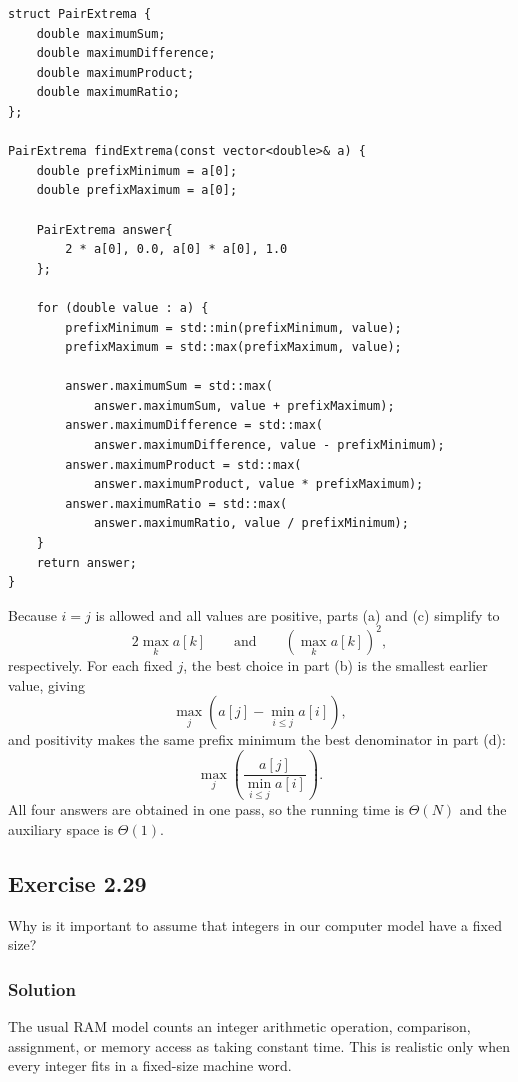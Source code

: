 \documentclass[12pt,a4paper]{article}
\begin{document}
\begin{lstlisting}
struct PairExtrema {
    double maximumSum;
    double maximumDifference;
    double maximumProduct;
    double maximumRatio;
};

PairExtrema findExtrema(const vector<double>& a) {
    double prefixMinimum = a[0];
    double prefixMaximum = a[0];

    PairExtrema answer{
        2 * a[0], 0.0, a[0] * a[0], 1.0
    };

    for (double value : a) {
        prefixMinimum = std::min(prefixMinimum, value);
        prefixMaximum = std::max(prefixMaximum, value);

        answer.maximumSum = std::max(
            answer.maximumSum, value + prefixMaximum);
        answer.maximumDifference = std::max(
            answer.maximumDifference, value - prefixMinimum);
        answer.maximumProduct = std::max(
            answer.maximumProduct, value * prefixMaximum);
        answer.maximumRatio = std::max(
            answer.maximumRatio, value / prefixMinimum);
    }
    return answer;
}
\end{lstlisting}

Because $i=j$ is allowed and all values are positive, parts (a) and
(c) simplify to
\[
\boxed{2\max_k a[k]}
\qquad\text{and}\qquad
\boxed{\left(\max_k a[k]\right)^2},
\]
respectively. For each fixed $j$, the best choice in part (b) is the
smallest earlier value, giving
\[
\boxed{\max_j\left(a[j]-\min_{i\leq j}a[i]\right)},
\]
and positivity makes the same prefix minimum the best denominator in
part (d):
\[
\boxed{\max_j\left(\frac{a[j]}{\min_{i\leq j}a[i]}\right)}.
\]
All four answers are obtained in one pass, so the running time is
$\boxed{\Theta(N)}$ and the auxiliary space is $\boxed{\Theta(1)}$.

\subsection*{\color{sectionnavy}Exercise 2.29}

\noindent
Why is it important to assume that integers in our computer model have
a fixed size?

\subsubsection*{\color{sectionnavy}Solution}

The usual RAM model counts an integer arithmetic operation, comparison,
assignment, or memory access as taking constant time. This is realistic
only when every integer fits in a fixed-size machine word.
\end{document}
